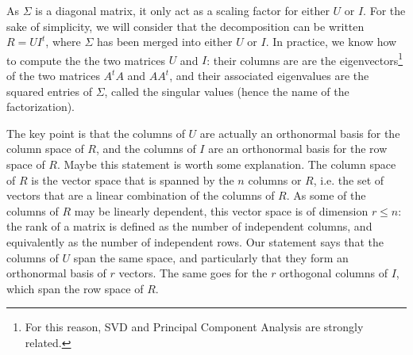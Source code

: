 As $\Sigma$ is a diagonal matrix, it only act as a scaling factor for either $U$ or
$I$. For the sake of simplicity, we will consider that the decomposition can be
written $R = UI^t$, where $\Sigma$ has been merged into either $U$ or $I$. In
practice, we know how to compute the the two matrices $U$ and $I$: their
columns are are the
eigenvectors\footnote{For this reason, SVD and Principal Component Analysis are
strongly related.} of the two matrices $A^tA$ and $AA^t$, and their associated
eigenvalues are the squared entries of $\Sigma$, called the singular values
(hence the name of the factorization).

The key point is that the columns of $U$ are actually an orthonormal basis for
the column space of $R$, and the columns of $I$ are an orthonormal basis for the
row space of $R$. Maybe this statement is worth some explanation. The column
space of $R$ is the vector space that is spanned by the $n$ columns or $R$,
i.e. the set of vectors that are a linear combination of the columns of $R$. As
some of the columns of $R$ may be linearly dependent, this vector space is of
dimension $r\leq n$: the rank of a matrix is defined as the number of
independent columns, and equivalently as the number of independent rows. Our
statement says that the columns of $U$ span the same space, and particularly that they form
an orthonormal basis of $r$ vectors. The same goes for the $r$ orthogonal columns
of $I$, which span the row space of $R$.

